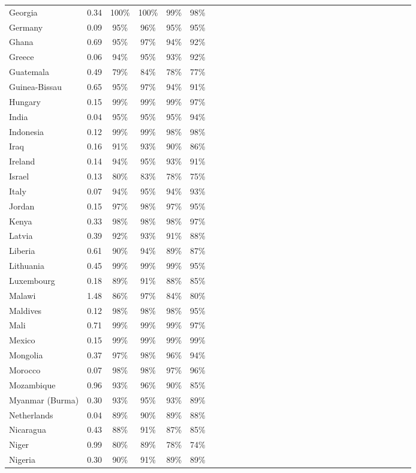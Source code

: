 \begin{ThreePartTable}
\begin{longtable}[t]{l|ccccl|ccccl|ccccl|ccccl|ccccl|cccc}
Georgia & 0.34 & 100\% & 100\% & 99\% & 98\%\\
Germany & 0.09 & 95\% & 96\% & 95\% & 95\%\\
Ghana & 0.69 & 95\% & 97\% & 94\% & 92\%\\
Greece & 0.06 & 94\% & 95\% & 93\% & 92\%\\
Guatemala & 0.49 & 79\% & 84\% & 78\% & 77\%\\
Guinea-Bissau & 0.65 & 95\% & 97\% & 94\% & 91\%\\
Hungary & 0.15 & 99\% & 99\% & 99\% & 97\%\\
India & 0.04 & 95\% & 95\% & 95\% & 94\%\\
Indonesia & 0.12 & 99\% & 99\% & 98\% & 98\%\\
Iraq & 0.16 & 91\% & 93\% & 90\% & 86\%\\
Ireland & 0.14 & 94\% & 95\% & 93\% & 91\%\\
Israel & 0.13 & 80\% & 83\% & 78\% & 75\%\\
Italy & 0.07 & 94\% & 95\% & 94\% & 93\%\\
Jordan & 0.15 & 97\% & 98\% & 97\% & 95\%\\
Kenya & 0.33 & 98\% & 98\% & 98\% & 97\%\\
Latvia & 0.39 & 92\% & 93\% & 91\% & 88\%\\
Liberia & 0.61 & 90\% & 94\% & 89\% & 87\%\\
Lithuania & 0.45 & 99\% & 99\% & 99\% & 95\%\\
Luxembourg & 0.18 & 89\% & 91\% & 88\% & 85\%\\
Malawi & 1.48 & 86\% & 97\% & 84\% & 80\%\\
Maldives & 0.12 & 98\% & 98\% & 98\% & 95\%\\
Mali & 0.71 & 99\% & 99\% & 99\% & 97\%\\
Mexico & 0.15 & 99\% & 99\% & 99\% & 99\%\\
Mongolia & 0.37 & 97\% & 98\% & 96\% & 94\%\\
Morocco & 0.07 & 98\% & 98\% & 97\% & 96\%\\
Mozambique & 0.96 & 93\% & 96\% & 90\% & 85\%\\
Myanmar (Burma) & 0.30 & 93\% & 95\% & 93\% & 89\%\\
Netherlands & 0.04 & 89\% & 90\% & 89\% & 88\%\\
Nicaragua & 0.43 & 88\% & 91\% & 87\% & 85\%\\
Niger & 0.99 & 80\% & 89\% & 78\% & 74\%\\
Nigeria & 0.30 & 90\% & 91\% & 89\% & 89\%\\

\end{longtable}
\end{ThreePartTable}
